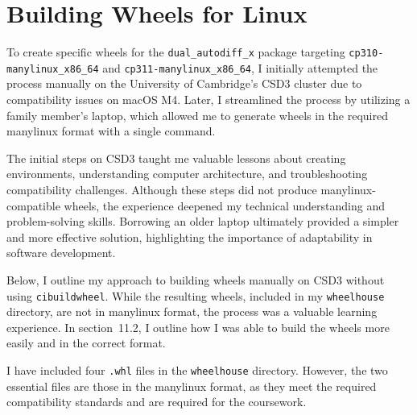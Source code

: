 \documentclass[a4paper,12pt]{article}
\begin{document}
\section{Building Wheels for Linux}

To create specific wheels for the \texttt{dual\_autodiff\_x} package targeting \texttt{cp310-manylinux\_x86\_64} and \texttt{cp311-manylinux\_x86\_64}, I initially attempted the process manually on the University of Cambridge's CSD3 cluster due to compatibility issues on macOS M4. Later, I streamlined the process by utilizing a family member's laptop, which allowed me to generate wheels in the required manylinux format with a single command.

The initial steps on CSD3 taught me valuable lessons about creating environments, understanding computer architecture, and troubleshooting compatibility challenges. Although these steps did not produce manylinux-compatible wheels, the experience deepened my technical understanding and problem-solving skills. Borrowing an older laptop ultimately provided a simpler and more effective solution, highlighting the importance of adaptability in software development.

Below, I outline my approach to building wheels manually on CSD3 without using \texttt{cibuildwheel}. While the resulting wheels, included in my \texttt{wheelhouse} directory, are not in manylinux format, the process was a valuable learning experience. In section~11.2, I outline how I was able to build the wheels more easily and in the correct format.

I have included four \texttt{.whl} files in the \texttt{wheelhouse} directory. However, the two essential files are those in the manylinux format, as they meet the required compatibility standards and are required for the coursework.
\end{document}
